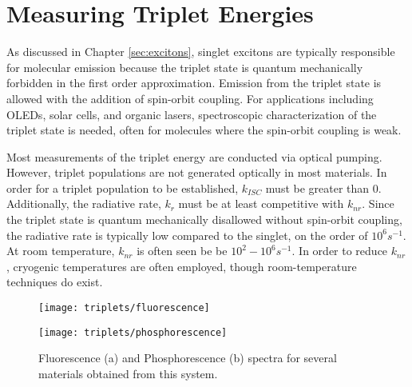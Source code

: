 \documentclass[../thesis.tex]{subfiles}
\begin{document}
\chapter{Measuring Triplet Energies}\label{sec:triplets}

As discussed in Chapter \ref{sec:excitons}, singlet excitons are typically responsible for molecular emission because the triplet state is quantum mechanically forbidden in the first order approximation.\supercite{Turro1991a}
Emission from the triplet state is allowed with the addition of spin-orbit coupling.\supercite{Baldo1998a}
For applications including OLEDs, solar cells, and organic lasers, spectroscopic characterization of the triplet state is needed, often for molecules where the spin-orbit coupling is weak.\supercite{Tokito2003a,Goushi2004d,Zhang2011a,Schueppel2007}

Most measurements of the triplet energy are conducted via optical pumping.\supercite{Turro1991a,Goushi2004d,Padhye1956,Holmes2003}
However, triplet populations are not generated optically in most materials.\supercite{Turro1991a}
In order for a triplet population to be established, $k_{ISC}$ must be greater than 0.
Additionally, the radiative rate, $k_r$ must be at least competitive with $k_{nr}$.
Since the triplet state is quantum mechanically disallowed without spin-orbit coupling, the radiative rate is typically low compared to the singlet, on the order of $10^6 s^{-1}$.
At room temperature, $k_{nr}$ is often seen be be $10^2-10^6 s^{-1}$.\supercite{Reineke2014}
In order to reduce $k_{nr}$, cryogenic temperatures are often employed, though room-temperature techniques do exist.\supercite{Reineke2014}

\begin{wrapfigure}{r}{.5\textwidth}
    \begin{minipage}{\linewidth}
    \centering%
    \texttt{[image: triplets/fluorescence]}

    \texttt{[image: triplets/phosphorescence]}
\end{minipage}
\caption{Fluorescence (a) and Phosphorescence (b) spectra for several materials obtained from this system.}
\label{fig:triplets}
\end{wrapfigure}
\end{document}

